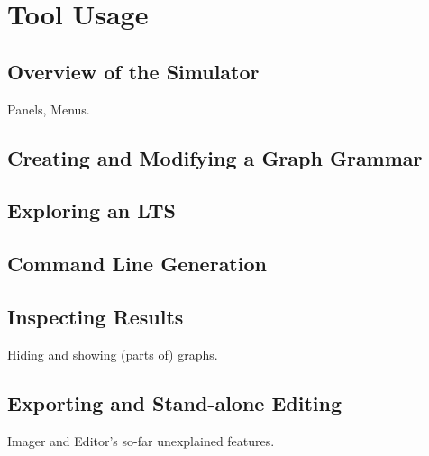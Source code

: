\section{Tool Usage}

\subsection{Overview of the Simulator}

Panels, Menus.

\subsection{Creating and Modifying a Graph Grammar}

\subsection{Exploring an LTS}

\subsection{Command Line Generation}

\subsection{Inspecting Results}

Hiding and showing (parts of) graphs.

\subsection{Exporting and Stand-alone Editing}

Imager and Editor's so-far unexplained features.